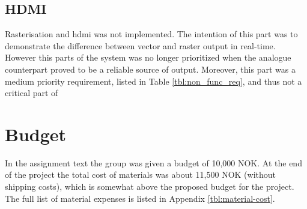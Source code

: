 \subsection{HDMI}
Rasterisation and \gls{hdmi} was not implemented.
The intention of this part was to demonstrate the difference between vector and raster output in real-time.
However this parts of the system was no longer prioritized when the analogue counterpart proved to be a reliable source of output.
Moreover, this part was a medium priority requirement, listed in Table \ref{tbl:non_func_req}, and thus not a critical part of \vthreek 

\section{Budget}
In the assignment text the group was given a budget of 10,000 NOK.
At the end of the project the total cost of materials was about 11,500 NOK (without shipping costs), which is somewhat above the proposed budget for the project.
The full list of material expenses is listed in Appendix \ref{tbl:material-cost}.